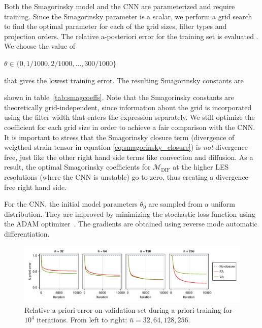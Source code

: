 \documentclass[preprint]{elsarticle}
\newcommand{\R}[1]{}
\newcommand{\revone}[1]{#1}
\begin{document}
Both the Smagorinsky model and the CNN are parameterized and require training.
Since the Smagorinsky parameter is a scalar, we perform a grid search to find
the optimal parameter for each of the \revone{grid sizes},
filter types and projection orders.
The relative a-posteriori error for the training set is evaluated
\revone{}.
We choose the value of
\revone{
    
    $\theta \in \{ 0, 1/1000, 2/1000, \dots, 300/1000 \}$
}
that gives the lowest training error.
The resulting Smagorinsky constants are
\revone{
    \R{smagcoeffs}
    
    shown in table~\ref{tab:smagcoeffs}.
    Note that the Smagorinsky constants are theoretically grid-independent,
    since information about the grid is incorporated using the filter width that
    enters the expression separately. We still optimize the coefficient for each
    grid size in order to achieve a fair comparison with the CNN.
    It is important to stress that the Smagorinsky closure term (divergence of
    weigthed strain tensor in equation \eqref{eq:smagorinsky_closure}) is
    \emph{not} divergence-free, just like the other right hand side terms like convection and diffusion. As a result, the optimal Smagorinsky coefficients for $\mathcal{M}_\text{DIF}$
    at the higher LES resolutions (where the CNN is unstable) go to zero, thus creating a divergence-free right hand side.
}

For the CNN, the initial model parameters $\theta_0$ are sampled from a uniform
distribution. They are improved by minimizing the stochastic loss function using
the ADAM optimizer~\cite{Kingma2017}. The gradients are obtained using reverse
mode automatic differentiation.

\begin{figure}
    \centering
    \includegraphics[width=1\textwidth]{figures_kolmogorov_priortraining.pdf}
    \caption{\revone{
        Relative a-priori error on validation set during a-priori training for
        $10^4$ iterations. From left to right: $\bar{n} = 32, 64, 128, 256$.
    }}
    \label{fig:priortraining}
\end{figure}
\end{document}
